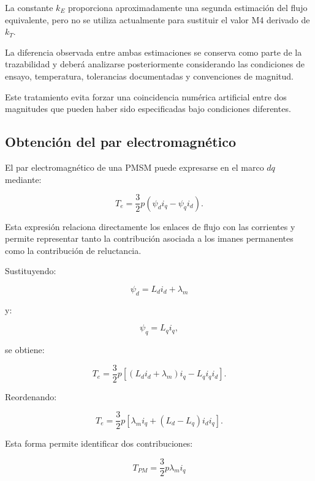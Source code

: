 La constante $k_E$ proporciona aproximadamente una segunda estimación del flujo equivalente, pero no se utiliza actualmente para sustituir el valor M4 derivado de $k_T$.

La diferencia observada entre ambas estimaciones se conserva como parte de la trazabilidad y deberá analizarse posteriormente considerando las condiciones de ensayo, temperatura, tolerancias documentadas y convenciones de magnitud.

Este tratamiento evita forzar una coincidencia numérica artificial entre dos magnitudes que pueden haber sido especificadas bajo condiciones diferentes.

\subsection{Obtención del par electromagnético}

El par electromagnético de una PMSM puede expresarse en el marco $dq$ mediante:

\begin{equation}
T_e
=
\frac{3}{2}p
\left(
\psi_di_q-\psi_qi_d
\right).
\end{equation}

Esta expresión relaciona directamente los enlaces de flujo con las corrientes y permite representar tanto la contribución asociada a los imanes permanentes como la contribución de reluctancia.

Sustituyendo:

\begin{equation}
\psi_d=L_di_d+\lambda_m
\end{equation}

y:

\begin{equation}
\psi_q=L_qi_q,
\end{equation}

se obtiene:

\begin{equation}
T_e
=
\frac{3}{2}p
\left[
(L_di_d+\lambda_m)i_q
-
L_qi_qi_d
\right].
\end{equation}

Reordenando:

\begin{equation}
T_e
=
\frac{3}{2}p
\left[
\lambda_mi_q
+
(L_d-L_q)i_di_q
\right].
\end{equation}

Esta forma permite identificar dos contribuciones:

\begin{equation}
T_{PM}
=
\frac{3}{2}p\lambda_mi_q
\end{equation}

